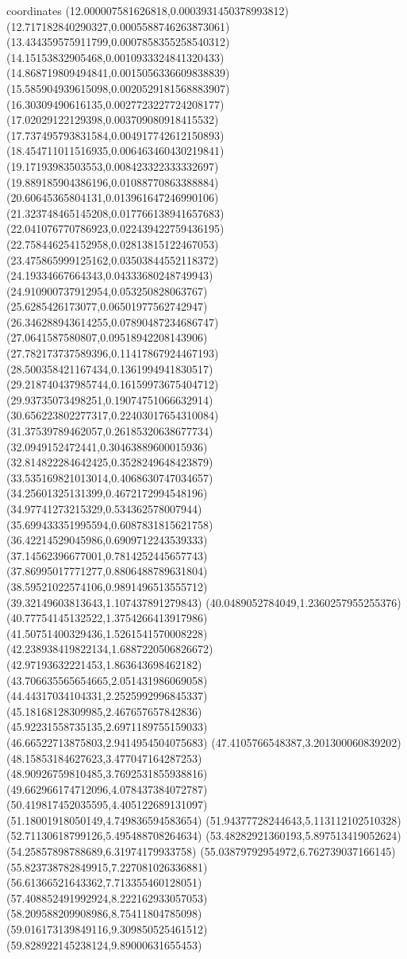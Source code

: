 coordinates {%
(12.000007581626818,0.0003931450378993812)
(12.717182840290327,0.0005588746263873061)
(13.434359575911799,0.0007858355258540312)
(14.15153832905468,0.0010933324841320433)
(14.868719809494841,0.0015056336609838839)
(15.585904939615098,0.0020529181568883907)
(16.30309490616135,0.0027723227724208177)
(17.02029122129398,0.003709080918415532)
(17.737495793831584,0.004917742612150893)
(18.454711011516935,0.006463460430219841)
(19.17193983503553,0.008423322333332697)
(19.889185904386196,0.01088770863388884)
(20.60645365804131,0.013961647246990106)
(21.323748465145208,0.017766138941657683)
(22.041076770786923,0.022439422759436195)
(22.758446254152958,0.02813815122467053)
(23.475865999125162,0.03503844552118372)
(24.19334667664343,0.04333680248749943)
(24.910900737912954,0.053250828063767)
(25.6285426173077,0.06501977562742947)
(26.346288943614255,0.07890487234686747)
(27.0641587580807,0.09518942208143906)
(27.782173737589396,0.11417867924467193)
(28.500358421167434,0.1361994941830517)
(29.218740437985744,0.16159973675404712)
(29.93735073498251,0.19074751066632914)
(30.656223802277317,0.22403017654310084)
(31.37539789462057,0.26185320638677734)
(32.0949152472441,0.30463889600015936)
(32.814822284642425,0.3528249648423879)
(33.535169821013014,0.4068630747034657)
(34.25601325131399,0.4672172994548196)
(34.97741273215329,0.534362578007944)
(35.699433351995594,0.6087831815621758)
(36.42214529045986,0.6909712243539333)
(37.14562396677001,0.7814252445657743)
(37.86995017771277,0.8806488789631804)
(38.59521022574106,0.9891496513555712)
(39.32149603813643,1.107437891279843)
(40.0489052784049,1.2360257955255376)
(40.77754145132522,1.3754266413917986)
(41.50751400329436,1.5261541570008228)
(42.238938419822134,1.6887220506826672)
(42.97193632221453,1.863643698462182)
(43.706635565654665,2.051431986069058)
(44.44317034104331,2.2525992996845337)
(45.18168128309985,2.467657657842836)
(45.92231558735135,2.6971189755159033)
(46.66522713875803,2.9414954504075683)
(47.4105766548387,3.201300060839202)
(48.15853184627623,3.477047164287253)
(48.90926759810485,3.7692531855938816)
(49.662966174712096,4.078437384072787)
(50.419817452035595,4.405122689131097)
(51.18001918050149,4.749836594583654)
(51.94377728244643,5.113112102510328)
(52.71130618799126,5.495488708264634)
(53.48282921360193,5.897513419052624)
(54.25857898788689,6.31974179933758)
(55.03879792954972,6.762739037166145)
(55.823738782849915,7.227081026336881)
(56.61366521643362,7.713355460128051)
(57.408852491992924,8.222162933057053)
(58.209588209908986,8.75411804785098)
(59.016173139849116,9.309850525461512)
(59.828922145238124,9.89000631655453)
}
